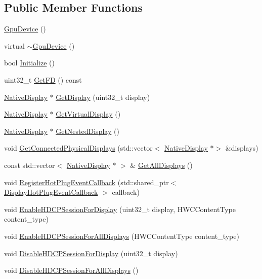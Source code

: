 \subsection*{Public Member Functions}
\begin{DoxyCompactItemize}
\item 
\mbox{\hyperlink{classhwcomposer_1_1GpuDevice_a058336b2b96090c51011b2d8e24a9765}{Gpu\+Device}} ()
\item 
virtual \mbox{\hyperlink{classhwcomposer_1_1GpuDevice_a2ccba76dae02bd1b810a90bb5c3c4183}{$\sim$\+Gpu\+Device}} ()
\item 
bool \mbox{\hyperlink{classhwcomposer_1_1GpuDevice_a794b3bd7590853c44f59e32252d2b3d7}{Initialize}} ()
\item 
uint32\+\_\+t \mbox{\hyperlink{classhwcomposer_1_1GpuDevice_a5b79c50e063249ae797255e73726df87}{Get\+FD}} () const
\item 
\mbox{\hyperlink{classhwcomposer_1_1NativeDisplay}{Native\+Display}} $\ast$ \mbox{\hyperlink{classhwcomposer_1_1GpuDevice_aca453b8ff7b694b6c0580f0c30573978}{Get\+Display}} (uint32\+\_\+t display)
\item 
\mbox{\hyperlink{classhwcomposer_1_1NativeDisplay}{Native\+Display}} $\ast$ \mbox{\hyperlink{classhwcomposer_1_1GpuDevice_adfec63ead3453ee2cd80b5183d4961d8}{Get\+Virtual\+Display}} ()
\item 
\mbox{\hyperlink{classhwcomposer_1_1NativeDisplay}{Native\+Display}} $\ast$ \mbox{\hyperlink{classhwcomposer_1_1GpuDevice_aa5ea5011fbcb67cddb67faca689c97d1}{Get\+Nested\+Display}} ()
\item 
void \mbox{\hyperlink{classhwcomposer_1_1GpuDevice_a1283357881144bc77606b18505fc8fce}{Get\+Connected\+Physical\+Displays}} (std\+::vector$<$ \mbox{\hyperlink{classhwcomposer_1_1NativeDisplay}{Native\+Display}} $\ast$$>$ \&displays)
\item 
const std\+::vector$<$ \mbox{\hyperlink{classhwcomposer_1_1NativeDisplay}{Native\+Display}} $\ast$ $>$ \& \mbox{\hyperlink{classhwcomposer_1_1GpuDevice_a36bad6a205218da9546f18e282af05a5}{Get\+All\+Displays}} ()
\item 
void \mbox{\hyperlink{classhwcomposer_1_1GpuDevice_a5d28fa3fc5eda73115f36d371aa37664}{Register\+Hot\+Plug\+Event\+Callback}} (std\+::shared\+\_\+ptr$<$ \mbox{\hyperlink{classhwcomposer_1_1DisplayHotPlugEventCallback}{Display\+Hot\+Plug\+Event\+Callback}} $>$ callback)
\item 
void \mbox{\hyperlink{classhwcomposer_1_1GpuDevice_aa558c97ab2f80eac47ede0a788a59a28}{Enable\+H\+D\+C\+P\+Session\+For\+Display}} (uint32\+\_\+t display, H\+W\+C\+Content\+Type content\+\_\+type)
\item 
void \mbox{\hyperlink{classhwcomposer_1_1GpuDevice_a5a42e70ab1648c6e7741b2322f898691}{Enable\+H\+D\+C\+P\+Session\+For\+All\+Displays}} (H\+W\+C\+Content\+Type content\+\_\+type)
\item 
void \mbox{\hyperlink{classhwcomposer_1_1GpuDevice_ae61aa61ee1591464e7e5a703b2c6c848}{Disable\+H\+D\+C\+P\+Session\+For\+Display}} (uint32\+\_\+t display)
\item 
void \mbox{\hyperlink{classhwcomposer_1_1GpuDevice_a7038e1dc3d4a2be7206e6a35717521e2}{Disable\+H\+D\+C\+P\+Session\+For\+All\+Displays}} ()
\end{DoxyCompactItemize}
